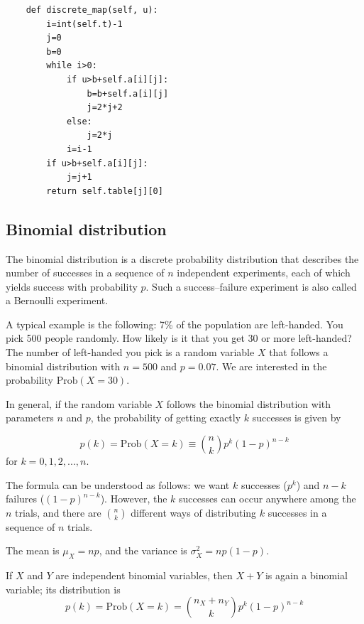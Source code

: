 \documentclass[justified,sixbynine]{tufte-book}
\theoremstyle{plain}%
\theoremstyle{definition}
\theoremstyle{remark}
\begin{document}
\begin{fullwidth}
\begin{lstlisting}
    def discrete_map(self, u):
        i=int(self.t)-1
        j=0
        b=0
        while i>0:
            if u>b+self.a[i][j]:
                b=b+self.a[i][j]
                j=2*j+2
            else:
                j=2*j
            i=i-1
        if u>b+self.a[i][j]:
            j=j+1
        return self.table[j][0]
\end{lstlisting}


\goodbreak\subsection{Binomial distribution}


The binomial distribution is a discrete probability distribution that
describes the number of successes in a sequence of $n$ independent
experiments, each of which yields success with probability $p$. Such a
success--failure experiment is also called a Bernoulli experiment.

A typical example is the following: 7\% of the population are left-handed.
You pick 500 people randomly. How likely is it that you get 30 or more
left-handed? The number of left-handed you pick is a random variable $X$
that follows a binomial distribution with $n=500$ and $p=0.07$. We are
interested in the probability $\textrm{Prob}(X=30)$.

In general, if the random variable $X$ follows the binomial distribution with
parameters $n$ and $p$, the probability of getting exactly $k$ successes is
given by

\begin{equation}
p(k)=\textrm{Prob}(X=k) \equiv  \binom nkp^k(1-p)^{n-k}
\end{equation}
for $k=0,1,2,...,n$.

The formula can be understood as follows: we want $k$ successes ($p^k$) and $%
n-k$ failures ($(1-p)^{n-k}$). However, the $k$ successes can occur anywhere
among the $n$ trials, and there are $\binom nk$ different ways of distributing
$k$ successes in a sequence of $n$ trials.

The mean is $\mu _X=np$, and the variance is $\sigma _X^2=np(1-p)$.

If $X$ and $Y$ are independent binomial variables, then $X+Y$ is again a
binomial variable; its distribution is
\begin{equation}
p(k)=\textrm{Prob}(X=k)=\binom{n_X+n_Y}kp^k(1-p)^{n-k}
\end{equation}


\end{fullwidth}
\end{document}
